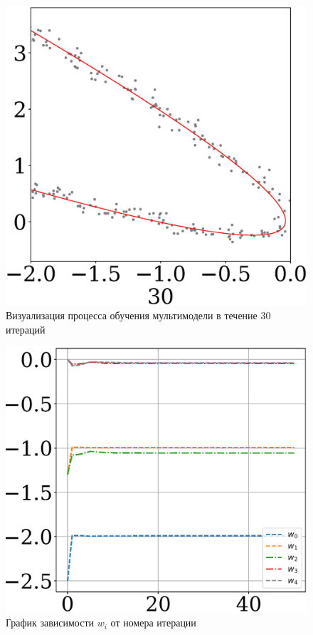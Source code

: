 \documentclass[12pt,twoside]{article}
\begin{document}
\begin{figure}
\begin{minipage}{.20\textwidth}
      \includegraphics[scale = 0.19]{511_30.eps}
\end{minipage}
\caption{Визуализация процесса обучения мультимодели в течение 30 итераций}
\end{figure}
\begin{figure}[h!]
    \centering
    \includegraphics[scale = 0.5]{511w.eps}
    \caption{График зависимости $w_i$ от номера итерации}
\end{figure} 
\end{document}
